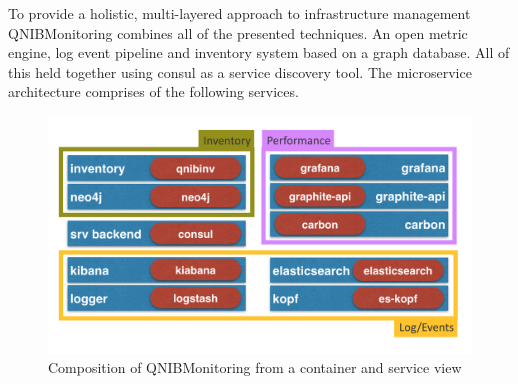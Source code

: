 To provide a holistic, multi-layered approach to infrastructure management QNIBMonitoring combines all of the presented techniques.
An open metric engine, log event pipeline and inventory system based on a graph database. All of this held together using consul as a service discovery
tool.
The microservice architecture comprises of the following services.
\begin{figure}[!ht]
    \includegraphics[width=.4\textwidth]{images/png/qnibmon_arch.png}
    \caption{\label{fig:vortex_street}Composition of QNIBMonitoring from a container and service view}
\end{figure}